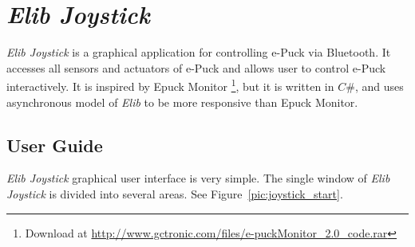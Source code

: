 \chapter{{\it Elib Joystick}} \label{app:joystick}
  {\it Elib Joystick} is a graphical application for controlling e-Puck via Bluetooth.
  It accesses all sensors and actuators of e-Puck and allows user to control e-Puck interactively.
  It is inspired by Epuck Monitor 
  \footnote{\small{Download at \url{http://www.gctronic.com/files/e-puckMonitor_2.0_code.rar}}},
  but it is written in $C\#$, and uses asynchronous model
  of {\it Elib} to be more responsive than Epuck Monitor.

  \section{User Guide} \label{sec:joyguide}
  {\it Elib Joystick} graphical user interface is very simple. The single window of {\it Elib Joystick} 
  is divided into several areas.
  See Figure~\ref{pic:joystick_start}.

